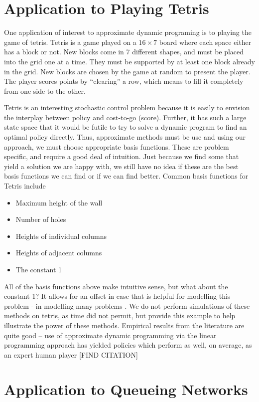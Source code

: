 \documentclass[12pt,reqno]{amsart}
\numberwithin{equation}{section}
\begin{document}
\section{Application to Playing Tetris}

One application of interest to approximate dynamic programing is to playing the game of tetris. Tetris is a game played on a $16 \times 7$ board where each space either has a block or not. New blocks come in 7 different shapes, and must be placed into the grid one at a time. They must be supported by at least one block already in the grid. New blocks are chosen by the game at random to present the player. The player scores points by ``clearing'' a row, which means to fill it completely from one side to the other.

Tetris is an interesting stochastic control problem because it is easily to envision the interplay between policy and cost-to-go (score). Further, it has such a large state space that it would be futile to try to solve a dynamic program to find an optimal policy directly. Thus, approximate methods must be use and using our approach, we must choose appropriate basis functions. These are problem specific, and require a good deal of intuition. Just because we find some that yield a solution we are happy with, we still have no idea if these are the best basis functions we can find or if we can find better. Common basis functions for Tetris include
\begin{itemize}
\item Maximum height of the wall
\item Number of holes
\item Heights of individual columns
\item Heights of adjacent columns
\item The constant 1
\end{itemize}

All of the basis functions above make intuitive sense, but what about the constant 1? It allows for an offset in case that is helpful for modelling this problem - in modelling many problems . We do not perform simulations of these methods on tetris, as time did not permit, but provide this example to help illustrate the power of these methods. Empirical results from the literature are quite good -- use of approximate dynamic programming via the linear programming approach has yielded policies which perform as well, on average, as an expert human player [FIND CITATION]

\section{Application to Queueing Networks}
\end{document}
